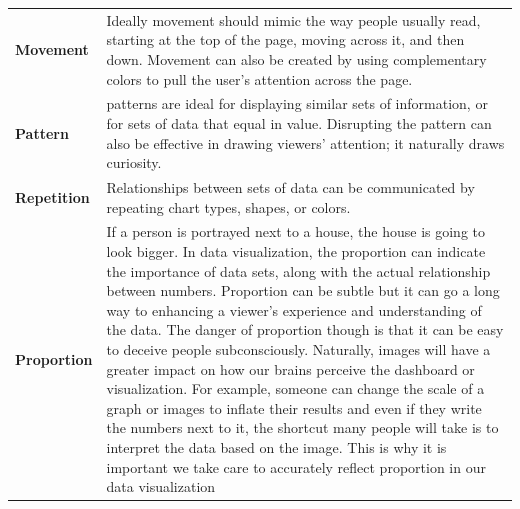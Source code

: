 \documentclass[]{book}
\theoremstyle{definition}
\theoremstyle{definition}
\theoremstyle{definition}
\theoremstyle{remark}
\begin{document}
\begin{longtable}[]{@{}ll@{}}
\begin{minipage}[t]{0.16\columnwidth}
\textbf{Movement}\strut
\end{minipage} & \begin{minipage}[t]{0.78\columnwidth}\raggedright\strut
Ideally movement should mimic the way people usually read, starting at
the top of the page, moving across it, and then down. Movement can also
be created by using complementary colors to pull the user's attention
across the page.\strut
\end{minipage}\tabularnewline
\begin{minipage}[t]{0.16\columnwidth}\raggedright\strut
\textbf{Pattern}\strut
\end{minipage} & \begin{minipage}[t]{0.78\columnwidth}\raggedright\strut
patterns are ideal for displaying similar sets of information, or for
sets of data that equal in value. Disrupting the pattern can also be
effective in drawing viewers' attention; it naturally draws
curiosity.\strut
\end{minipage}\tabularnewline
\begin{minipage}[t]{0.16\columnwidth}\raggedright\strut
\textbf{Repetition}\strut
\end{minipage} & \begin{minipage}[t]{0.78\columnwidth}\raggedright\strut
Relationships between sets of data can be communicated by repeating
chart types, shapes, or colors.\strut
\end{minipage}\tabularnewline
\begin{minipage}[t]{0.16\columnwidth}\raggedright\strut
\textbf{Proportion}\strut
\end{minipage} & \begin{minipage}[t]{0.78\columnwidth}\raggedright\strut
If a person is portrayed next to a house, the house is going to look
bigger. In data visualization, the proportion can indicate the
importance of data sets, along with the actual relationship between
numbers. Proportion can be subtle but it can go a long way to enhancing
a viewer's experience and understanding of the data. The danger of
proportion though is that it can be easy to deceive people
subconsciously. Naturally, images will have a greater impact on how our
brains perceive the dashboard or visualization. For example, someone can
change the scale of a graph or images to inflate their results and even
if they write the numbers next to it, the shortcut many people will take
is to interpret the data based on the image. This is why it is important
we take care to accurately reflect proportion in our data visualization

\end{minipage}
\end{longtable}
\end{document}
